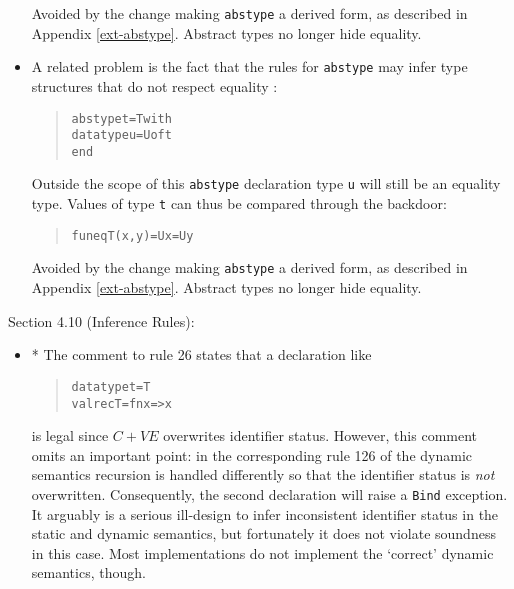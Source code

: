 \documentclass[twoside,titlepage]{article}
\begin{document}
\begin{appendix}
\begin{itemize}
Avoided by the change making {\tt abstype} a derived form, as described in Appendix \ref{ext-abstype}. Abstract types no longer hide equality.

\item A related problem is the fact that the rules for {\tt abstype} may infer type structures that do not respect equality \cite{addenda}:

\begin{quote}
\begin{alltt}
abstype t = T with
    datatype u = U of t
end
\end{alltt}
\end{quote}

Outside the scope of this {\tt abstype} declaration type {\tt u} will still be an equality type. Values of type {\tt t} can thus be compared through the backdoor:

\begin{quote}
\begin{alltt}
fun eqT(x,y) = U x = U y
\end{alltt}
\end{quote}

Avoided by the change making {\tt abstype} a derived form, as described in Appendix \ref{ext-abstype}. Abstract types no longer hide equality.

\end{itemize}


Section 4.10 (Inference Rules):

\begin{itemize}

\item * The comment to rule 26 states that a declaration like

\begin{quote}
\begin{alltt}
datatype t = T
val rec T = fn x => x
\end{alltt}
\end{quote}

is legal since $C+\mathit{VE}$ overwrites identifier status. However, this comment omits an important point: in the corresponding rule 126 of the dynamic semantics recursion is handled differently so that the identifier status is {\em not} overwritten. Consequently, the second declaration will raise a {\tt Bind} exception. It arguably is a serious ill-design to infer inconsistent identifier status in the static and dynamic semantics, but fortunately it does not violate soundness in this case. Most implementations do not implement the `correct' dynamic semantics, though.


\end{itemize}
\end{appendix}
\end{document}
